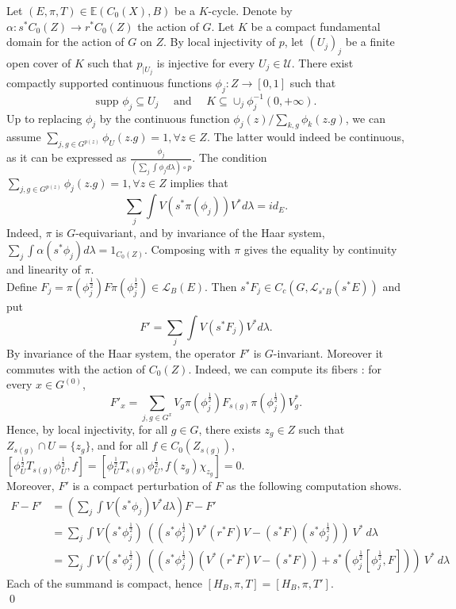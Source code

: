 \begin{dem}
Let $(E,\pi,T)\in \mathbb E(C_0(X),B)$ be a $K$-cycle. Denote by $\alpha : s^* C_0(Z) \rightarrow r^*C_0(Z)$ the action of $G$. Let $K$ be a compact fundamental domain for the action of $G$ on $Z$. By local injectivity of $p$, let $(U_j)_j$ be a finite open cover of $K$ such that $p_{|U_j}$ is injective for every $U_j\in \mathcal U$. There exist compactly supported continuous functions $\phi_j : Z\rightarrow [0,1]$ such that  \[\text{supp }\phi_j \subseteq U_j \quad\text{ and }\quad K\subseteq \cup_{j} \phi_j^{-1}(0,+\infty).\]
Up to replacing $\phi_j$ by the continuous function $\phi_j(z) / \sum_{k,g} \phi_k(z.g)$, we can assume $\sum_{j,g\in G^{p(z)}} \phi_U (z.g) = 1,\forall z\in Z$. The latter would indeed be continuous, as it can be expressed as $\frac{\phi_j} {(\sum_j\int \phi_j d\lambda ) \circ p }$. The condition $\sum_{j,g\in G^{p(z)}} \phi_j (z.g) = 1,\forall z\in Z$ implies that 
\[\sum_j \int V(s^*\pi(\phi_j))V^*d\lambda = id_E.\] 
Indeed, $\pi$ is $G$-equivariant, and by invariance of the Haar system, $\sum_j\int \alpha(s^*\phi_j)d\lambda = 1_{C_0(Z)}$. Composing with $\pi$ gives the equality by continuity and linearity of $\pi$.\\  

Define $F_j = \pi(\phi_j^\frac{1}{2}) F \pi(\phi_j^\frac{1}{2})\in\mathcal L_B(E)$. Then $s^* F_j\in C_c(G,\mathcal L_{s^* B}(s^* E))$ and put
\[F'= \sum_{j} \int V (s^*F_j) V^* d\lambda.\] 
By invariance of the Haar system, the operator $F'$ is  $G$-invariant. Moreover it commutes with the action of $C_0(Z)$. Indeed, we can compute its fibers : for every $x\in G^{(0)}$,
\[F'_x = \sum_{j, g\in G^x} V_g\pi(\phi_j^{\frac{1}{2}}) F_{s(g)}\pi(\phi_j^{\frac{1}{2}})V_g^*.\] 
Hence, by local injectivity, for all $g\in G$, there exists $z_g\in Z$ such that $Z_{s(g)}\cap U = \{z_g\}$, and for all $f\in C_0(Z_{s(g)})$, $[ \phi_U^{\frac{1}{2}} T_{s(g)} \phi_U^{\frac{1}{2}},f ] = [ \phi_U^{\frac{1}{2}} T_{s(g)} \phi_U^{\frac{1}{2}},f(z_g) \chi_{z_g} ]=0 $.\\

Moreover, $F'$ is a compact perturbation of $F$ as the following computation shows.\\
\[\begin{array}{rl}
F -F' 	& = (\sum_{j} \int V (s^* \phi_j) V^*d\lambda)F -F' \\
		& = \sum_{j}\int V (s^*\phi_j^{\frac{1}{2}}) \ 
\left( (s^*\phi_j^\frac{1}{2}) V^* (r^*F) V- (s^*F)(s^*\phi_j^\frac{1}{2}) \right) \ V^* \ d\lambda\\
		& = \sum_{j} \int V (s^*\phi_j^{\frac{1}{2}}) \ 
			\left( (s^*\phi_j^\frac{1}{2}) (V^* (r^*F)V - (s^*F)) + s^*(\phi_j^\frac{1}{2} [\phi_j^\frac{1}{2},F] )\right) \ 
				V^* \ d\lambda	  	
\end{array}\]
Each of the summand is compact, hence $[H_B, \pi,T]=[H_B,\pi,T']$.\\ 
\qed
\end{dem}

